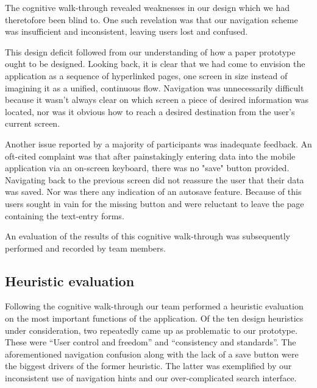 \documentclass{sigchi-ext}
\begin{document}
The cognitive walk-through revealed weaknesses in our design which we had theretofore been blind to.
One such revelation was that our navigation scheme was insufficient and inconsistent, leaving users
lost and confused.

This design deficit followed from our understanding of how a paper prototype
ought to be designed. Looking back, it is clear that we had come to envision
the application as a sequence of hyperlinked pages, one screen in size instead
of imagining it as a unified, continuous flow.  Navigation was unnecessarily
difficult because it wasn't always clear on which screen a piece of desired
information was located, nor was it obvious how to reach a desired destination
from the user's current screen.

Another issue reported by a majority of participants was inadequate feedback.
An oft-cited complaint was that after painstakingly entering data into the
mobile application via an on-screen keyboard, there was no "save" button
provided. Navigating back to the previous screen did not reassure the user that
their data was saved. Nor was there any indication of an autosave feature.
Because of this users sought in vain for the missing button and were reluctant
to leave the page containing the text-entry forms.

An evaluation of the results of this cognitive walk-through was subsequently
performed and recorded by team members.


\subsection{Heuristic evaluation}

Following the cognitive walk-through our team performed a heuristic evaluation on the most important
functions of the application. Of the ten design heuristics under consideration, two repeatedly came
up as problematic to our prototype. These were ``User control and freedom'' and ``consistency and
standards''. The aforementioned navigation confusion along with the lack of a save button were the
biggest drivers of the former heuristic. The latter was exemplified by our inconsistent use of
navigation hints and our over-complicated search interface.
\end{document}
